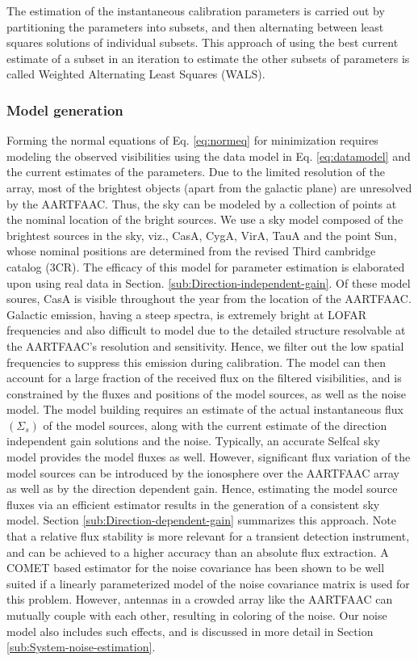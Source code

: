 \documentclass{aa}
\begin{document}
The estimation of the instantaneous calibration parameters is carried
out by partitioning the parameters into subsets, and then alternating
between least squares solutions of individual subsets. This approach
of using the best current estimate of a subset in an iteration to
estimate the other subsets of parameters is called Weighted Alternating
Least Squares (WALS).


\subsubsection{\label{sub:Model-generation}Model generation}

Forming the normal equations of Eq. \ref{eq:normeq} for minimization
requires modeling the observed visibilities using the data model in
Eq. \ref{eq:datamodel} and the current estimates of the parameters.
Due to the limited resolution of the array, most of the brightest
objects (apart from the galactic plane) are unresolved by the AARTFAAC.
Thus, the sky can be modeled by a collection of points at the nominal
location of the bright sources. We use a sky model composed of the
brightest sources in the sky, viz., CasA, CygA, VirA, TauA and the
point Sun, whose nominal positions are determined from the revised
Third cambridge catalog (3CR). The efficacy of this model for parameter
estimation is elaborated upon using real data in Section. \ref{sub:Direction-independent-gain}.
Of these model soures, CasA is visible throughout the year from the
location of the AARTFAAC. Galactic emission, having a steep spectra,
is extremely bright at LOFAR frequencies and also difficult to model
due to the detailed structure resolvable at the AARTFAAC's resolution
and sensitivity. Hence, we filter out the low spatial frequencies
to suppress this emission during calibration. The model can then account
for a large fraction of the received flux on the filtered visibilities,
and is constrained by the fluxes and positions of the model sources,
as well as the noise model. The model building requires an estimate
of the actual instantaneous flux $\left(\Sigma_{s}\right)$ of the
model sources, along with the current estimate of the direction independent
gain solutions and the noise. Typically, an accurate Selfcal sky model
provides the model fluxes as well. However, significant flux variation
of the model sources can be introduced by the ionosphere over the
AARTFAAC array as well as by the direction dependent gain. Hence,
estimating the model source fluxes via an efficient estimator results
in the generation of a consistent sky model. Section \ref{sub:Direction-dependent-gain}
summarizes this approach. Note that a relative flux stability is more
relevant for a transient detection instrument, and can be achieved
to a higher accuracy than an absolute flux extraction. A COMET based
estimator for the noise covariance has been shown to be well suited
if a linearly parameterized model of the noise covariance matrix is
used for this problem\cite{ottersten1998covariance}. However, antennas
in a crowded array like the AARTFAAC can mutually couple with each
other, resulting in coloring of the noise. Our noise model also includes
such effects, and is discussed in more detail in Section \ref{sub:System-noise-estimation}.
\end{document}
